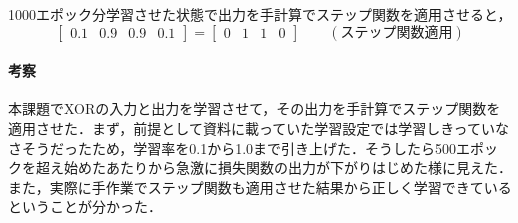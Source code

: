 \documentclass[11pt, a4paper]{jsarticle}
\begin{document}
  1000エポック分学習させた状態で出力を手計算でステップ関数を適用させると，
  \begin{equation*}
    \begin{bmatrix}0.1&0.9&0.9&0.1\end{bmatrix} = \begin{bmatrix}0&1&1&0\end{bmatrix} \qquad (\text{ステップ関数適用})
  \end{equation*}

  \paragraph{ 考察}
  本課題でXORの入力と出力を学習させて，その出力を手計算でステップ関数を適用させた．まず，前提として資料に載っていた学習設定では学習しきっていなさそうだったため，学習率を0.1から1.0まで引き上げた．そうしたら500エポックを超え始めたあたりから急激に損失関数の出力が下がりはじめた様に見えた．また，実際に手作業でステップ関数も適用させた結果から正しく学習できているということが分かった．
\end{document}
